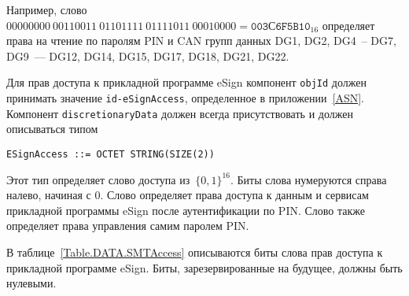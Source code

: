 Например, слово 
$00000000\ 00110011\ 01101111\ 01111011\ 00010000 = \texttt{003С6F5B10}_{16}$ 
определяет права на чтение по паролям PIN и CAN групп данных DG1, DG2, 
DG4~-- DG7, DG9~--- DG12, DG14, DG15, DG17, DG18, DG21, DG22.

Для прав доступа к прикладной программе eSign компонент \verb|objId| должен принимать 
значение \verb|id-eSignAccess|, определенное в приложении~\ref{ASN}. Компонент 
\verb|discretionaryData| должен всегда присутствовать и должен описываться типом  


\begin{verbatim}
ESignAccess ::= OCTET STRING(SIZE(2))
\end{verbatim}

Этот тип определяет слово доступа из~$\{0,1\}^{16}$. 
Биты слова нумеруются справа налево, начиная с 0. 
Слово определяет права доступа к данным и сервисам прикладной программы eSign
после аутентификации по PIN. Слово также определяет права управления самим 
паролем PIN. 

\begin{note}
\end{note}

В таблице~\ref{Table.DATA.SMTAccess} описываются биты слова прав доступа
к прикладной программе eSign. Биты, зарезервированные на будущее, 
должны быть нулевыми.

